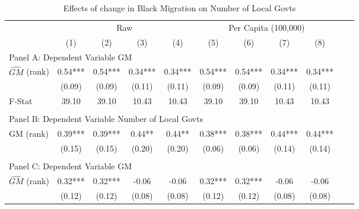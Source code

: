  \begin{table}[htbp]\centering {} \begin{threeparttable} \caption{Effects of change in Black Migration on Number of Local Govts} \begin{tabular}{l*{10}{c}} \toprule
                &\multicolumn{4}{c}{Raw}                                    &\multicolumn{4}{c}{Per Capita (100,000)}                   \\\cmidrule(lr){2-5}\cmidrule(lr){6-9}
                &\multicolumn{1}{c}{(1)}   &\multicolumn{1}{c}{(2)}   &\multicolumn{1}{c}{(3)}   &\multicolumn{1}{c}{(4)}   &\multicolumn{1}{c}{(5)}   &\multicolumn{1}{c}{(6)}   &\multicolumn{1}{c}{(7)}   &\multicolumn{1}{c}{(8)}   \\
\cmidrule(lr){1-9}
\multicolumn{8}{l}{Panel A: Dependent Variable GM}\\
\cmidrule(lr){1-9}
$\hat{GM}$ (rank)&       0.54***&       0.54***&       0.34***&       0.34***&       0.54***&       0.54***&       0.34***&       0.34***\\
                &     (0.09)   &     (0.09)   &     (0.11)   &     (0.11)   &     (0.09)   &     (0.09)   &     (0.11)   &     (0.11)   \\
\midrule
F-Stat          &      39.10   &      39.10   &      10.43   &      10.43   &      39.10   &      39.10   &      10.43   &      10.43   \\
\cmidrule[\heavyrulewidth](lr){1-9} \\ \cmidrule[\heavyrulewidth](lr){1-9}
\multicolumn{8}{l}{Panel B: Dependent Variable Number of Local Govts}\\
\cmidrule(lr){1-9}
GM  (rank)      &       0.39***&       0.39***&       0.44** &       0.44** &       0.38***&       0.38***&       0.44***&       0.44***\\
                &     (0.15)   &     (0.15)   &     (0.20)   &     (0.20)   &     (0.06)   &     (0.06)   &     (0.14)   &     (0.14)   \\
\cmidrule[\heavyrulewidth](lr){1-9} \\ \cmidrule[\heavyrulewidth](lr){1-9}
\multicolumn{8}{l}{Panel C: Dependent Variable GM}\\
\cmidrule(lr){1-9}
$\hat{GM}$ (rank)&       0.32***&       0.32***&      -0.06   &      -0.06   &       0.32***&       0.32***&      -0.06   &      -0.06   \\
                &     (0.12)   &     (0.12)   &     (0.08)   &     (0.08)   &     (0.12)   &     (0.12)   &     (0.08)   &     (0.08)   \\

\end{tabular}
\end{threeparttable}
\end{table}
